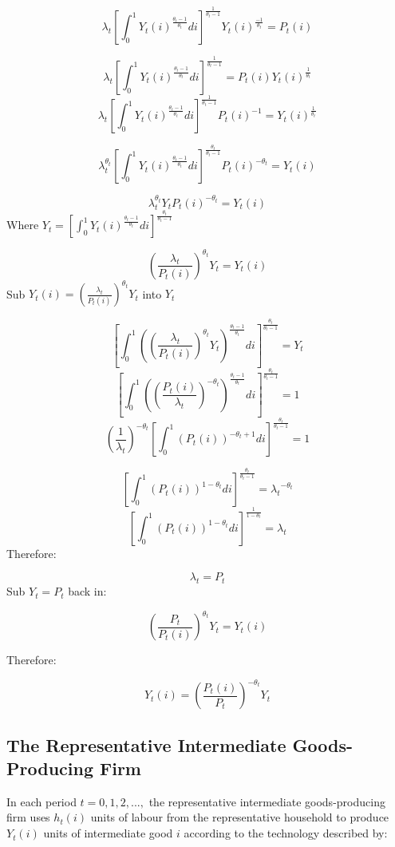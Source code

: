 \documentclass[11pt,preprint, authoryear]{elsarticle}
\numberwithin{equation}{section}
\numberwithin{figure}{section}
\numberwithin{table}{section}
\begin{document}
\[ \lambda_t[\int_0^1 Y_t(i)^{\frac{\theta_t-1}{\theta_t}} di]^{\frac{1}{\theta_t-1}} Y_t(i)^{\frac{-1}{\theta_t}} = P_t(i)\]

\[ \lambda_t[\int_0^1 Y_t(i)^{\frac{\theta_t-1}{\theta_t}} di]^{\frac{1}{\theta_t-1}}  = P_t(i)Y_t(i)^{\frac{1}{\theta_t}}\]
\[ \lambda_t[\int_0^1 Y_t(i)^{\frac{\theta_t-1}{\theta_t}} di]^{\frac{1}{\theta_t-1}}P_t(i)^{-1}  = Y_t(i)^{\frac{1}{\theta_t}}\]

\[ \lambda_t^{\theta_t} [\int_0^1 Y_t(i)^{\frac{\theta_t-1}{\theta_t}} di]^{\frac{\theta_t}{\theta_t-1}}P_t(i)^{-\theta_t}  = Y_t(i)\]

\[ \lambda_t^{\theta_t} Y_t P_t(i)^{-\theta_t} = Y_t(i)\] Where
\(Y_t = [\int_0^1 Y_t(i)^{\frac{\theta_t-1}{\theta_t}} di]^{\frac{\theta_t}{\theta_t-1}}\)

\[ (\frac{\lambda_t}{P_t(i)})^{\theta_t} Y_t  = Y_t(i)\] Sub
\(Y_t(i) = (\frac{\lambda_t}{P_t(i)})^{\theta_t} Y_t\) into \(Y_t\)

\[[\int_0^1 ((\frac{\lambda_t}{P_t(i)})^{\theta_t} Y_t)^{\frac{\theta_t-1}{\theta_t}} di]^{\frac{\theta_t}{\theta_t-1}}  = Y_t\]
\[[\int_0^1 ((\frac{P_t(i)}{\lambda_t})^{-\theta_t})^{\frac{\theta_t-1}{\theta_t}} di]^{\frac{\theta_t}{\theta_t-1}}  = 1\]
\[(\frac{1}{\lambda_t})^{-\theta_t}[\int_0^1 (P_t(i))^{-\theta_t+1} di]^{\frac{\theta_t}{\theta_t-1}}  = 1\]

\[[\int_0^1 (P_t(i))^{1-\theta_t} di]^{\frac{\theta_t}{\theta_t-1}}  = {\lambda_t}^{-\theta_t}\]
\[[\int_0^1 (P_t(i))^{1-\theta_t} di]^{\frac{1}{1-\theta_t}}  = {\lambda_t}\]
Therefore:

\[\lambda_t = P_t\] Sub \(Y_t = P_t\) back in:

\[(\frac{P_t}{P_t(i)})^{\theta_t} Y_t = Y_t(i)\]

Therefore:

\[Y_t(i) = (\frac{P_t(i)}{P_t})^{-\theta_t} Y_t\]

\hypertarget{the-representative-intermediate-goods-producing-firm}{%
\subsection{The Representative Intermediate Goods-Producing
Firm}\label{the-representative-intermediate-goods-producing-firm}}

In each period \(t=0,1,2,...,\) the representative intermediate
goods-producing firm uses \(h_t(i)\) units of labour from the
representative household to produce \(Y_t(i)\) units of intermediate
good \(i\) according to the technology described by:
\end{document}
